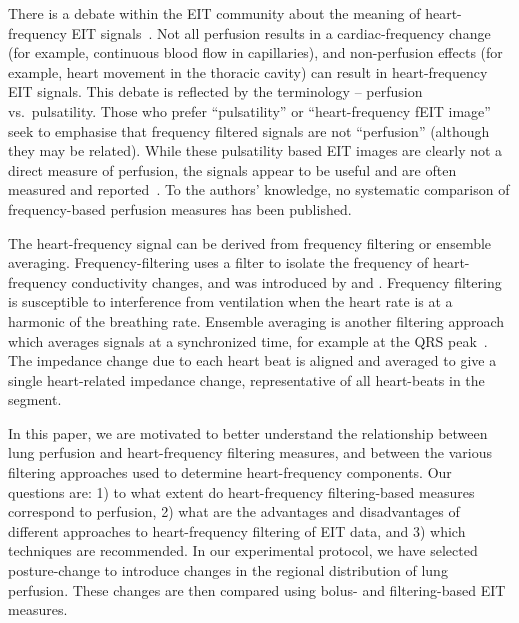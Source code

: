 There is a debate within the EIT community about the meaning of
heart-frequency EIT signals~\parencite{frerichs_chest_2017,adler_electrical_2017}. 
Not all perfusion results in a
cardiac-frequency change (for example, continuous blood flow in capillaries),
and
non-perfusion effects (for example, heart movement in the thoracic cavity)
can result in heart-frequency EIT signals.
This debate is reflected by the terminology 
-- perfusion vs.\ pulsatility.
Those who prefer ``pulsatility'' or ``heart-frequency fEIT image'' seek to emphasise that frequency
filtered signals are not ``perfusion'' (although they may be related).
While these pulsatility based EIT images are clearly not a direct measure of
perfusion, the signals appear to be useful and are often measured and 
reported~\parencite{bartocci_cerebral_1999,halter_imaging_2008,moens_variety_2014,ericsson_effect_2016}. 
To the authors' knowledge, no systematic comparison of
frequency-based perfusion measures has been published.

The heart-frequency signal can be derived from
frequency filtering or ensemble averaging.
Frequency-filtering uses a filter to isolate the frequency of heart-frequency conductivity changes,
and was introduced by  and . 
Frequency filtering is susceptible
to interference from ventilation when the heart rate is at a harmonic
of the breathing rate.
Ensemble averaging is another filtering approach which
averages signals at a synchronized time, for example at the QRS 
peak~\parencite{bartocci_cerebral_1999,deibele_dynamic_2008}. The impedance change due to each heart 
beat is aligned and averaged to give a single heart-related impedance change,
representative of all heart-beats in the segment.

In this paper, we are motivated to better understand the relationship between
lung perfusion and heart-frequency filtering measures, and between the various filtering
approaches used to determine heart-frequency components. Our questions are:
1) to what extent do heart-frequency filtering-based measures correspond to perfusion,
2) what are the advantages and disadvantages of different approaches
to heart-frequency filtering of EIT data, and 3) which techniques are recommended.
In our experimental protocol, we have selected posture-change 
to introduce changes in the regional distribution of lung perfusion.
These changes are then compared using bolus- and filtering-based
EIT measures.



